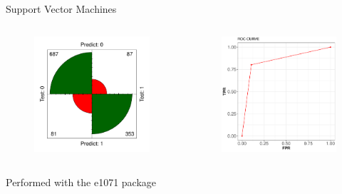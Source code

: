 \documentclass{beamer}
\begin{document}
\begin{frame}{Support Vector Machines}
\begin{columns}
  \begin{figure}[b]{\textwidth}
    \includegraphics[width=\textwidth]{Pic/SVM_confusion.pdf}
  \end{figure} 
  \begin{figure}[b]{\textwidth}
    \includegraphics[width=\textwidth]{Pic/ROC_SVM.pdf}
  \end{figure}
\end{columns}
\begin{center}
Performed with the e1071 package \cite{dimitriadou2008misc}
\end{center}
\end{frame}
\end{document}
